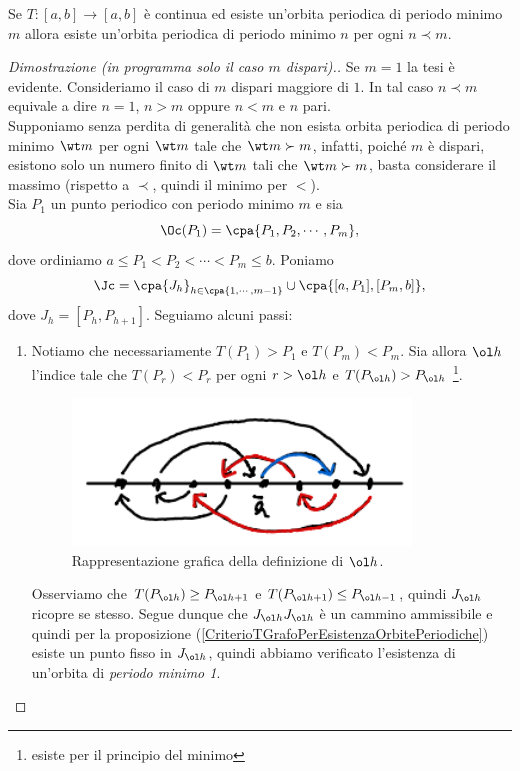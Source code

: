 \begin{theorem}[Sharkovsky]\label{TeoremaSharkovsky}
Se $T:[a,b]\to [a,b]$ \`e continua ed esiste un'orbita periodica di periodo minimo $m$ allora esiste un'orbita periodica di periodo minimo $n$ per ogni $n\prec m$.
\end{theorem}
\begin{proof}[Dimostrazione (in programma solo il caso $m$ dispari).]
Se $m=1$ la tesi \`e evidente. Consideriamo il caso di $m$ dispari maggiore di $1$. In tal caso $n\prec m$ equivale a dire $n=1$, $n>m$ oppure $n<m$ e $n$ pari.\\
Supponiamo senza perdita di generalit\`a che non esista orbita periodica di periodo minimo $\wt m$ per ogni $\wt m$ tale che $\wt m\succ m$, infatti, poich\'e $m$ \`e dispari, esistono solo un numero finito di $\wt m$ tali che $\wt m\succ m$, basta considerare il massimo (rispetto a $\prec$, quindi il minimo per $<$).\\
Sia $P_1$ un punto periodico con periodo minimo $m$ e sia
\[\Oc(P_1)=\cpa{P_1,P_2,\cdots, P_m},\]
dove ordiniamo $a \leq P_1 < P_2 < \cdots < P_m \leq b$. Poniamo
\[\Jc=\cpa{J_h}_{h\in\cpa{1,\cdots, m-1}}\cup \cpa{[a,P_1], [P_m,b]},\]
dove $J_h=[P_h,P_{h+1}]$. Seguiamo alcuni passi:
\setlength{\leftmargini}{0cm}
\begin{enumerate}
\item Notiamo che necessariamente $T(P_1)>P_1$ e $T(P_m)<P_m$. Sia allora $\ol h$ l'indice tale che $T(P_r)<P_r$ per ogni $r>\ol h$ e $T(P_{\ol h})>P_{\ol h}$ \footnote{esiste per il principio del minimo}. 

\begin{figure}[!htb]
	\centering
	\includegraphics[width=9cm]{Immagini/Definizione_hbarra.png}
	\caption{Rappresentazione grafica della definizione di $\ol h$.}
\end{figure}

Osserviamo che $T(P_{\ol h})\geq P_{\ol h+1}$ e $T(P_{\ol h+1})\leq P_{\ol h-1}$, quindi $J_{\ol h}$ ricopre se stesso. Segue dunque che $J_{\ol h}J_{\ol h}$ \`e un cammino ammissibile e quindi per la proposizione (\ref{CriterioTGrafoPerEsistenzaOrbitePeriodiche}) esiste un punto fisso in $J_{\ol h}$, quindi abbiamo verificato l'esistenza di un'orbita di \textit{periodo minimo 1}.


\end{enumerate}
\end{proof}
